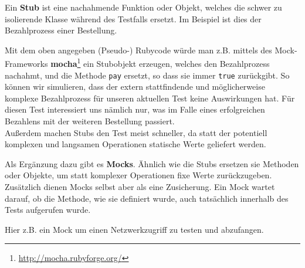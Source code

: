   Ein \textbf{Stub} ist eine nachahmende Funktion oder Objekt, welches die schwer zu isolierende Klasse während des Testfalls ersetzt. Im Beispiel ist dies der Bezahlprozess einer Bestellung.
%
%
%
%
\begin{ruby}[label=test\_bestellung.rb]
 

    

   
\end{ruby}

  Mit dem oben angegeben (Pseudo-) Rubycode würde man z.B. mittels des Mock-Frameworks \textbf{mocha}\footnote{\url{http://mocha.rubyforge.org/}} ein Stubobjekt erzeugen, welches den Bezahlprozess nachahmt, und die Methode \texttt{pay} ersetzt, so dass sie immer \texttt{true} zurückgibt. So können wir simulieren, dass der extern stattfindende und möglicherweise komplexe Bezahlprozess für unseren aktuellen Test keine Auswirkungen hat. Für diesen Test interessiert uns nämlich nur, was im Falle eines erfolgreichen Bezahlens mit der weiteren Bestellung passiert.\\
  Außerdem machen Stubs den Test meist schneller, da statt der potentiell komplexen und langsamen Operationen statische Werte geliefert werden.

  Als Ergänzung dazu gibt es \textbf{Mocks}. Ähnlich wie die Stubs ersetzen sie Methoden oder Objekte, um statt komplexer Operationen fixe Werte zurückzugeben. Zusätzlich dienen Mocks selbst aber als eine Zusicherung. Ein Mock wartet darauf, ob die Methode, wie sie definiert wurde, auch tatsächlich innerhalb des Tests aufgerufen wurde.

  Hier z.B. ein Mock um einen Netzwerkzugriff zu testen und abzufangen.
%
%
\begin{ruby}[label=test\_http.rb]
 
\end{ruby}

